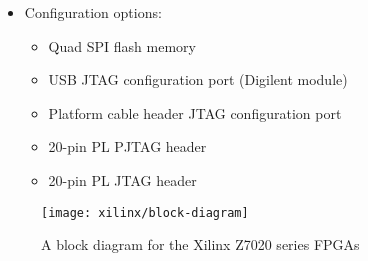 \begin{itemize}
    \item Configuration options:
    \begin{itemize}
        \item Quad \gls{SPI} flash memory
        \item \gls{USB} \gls{JTAG} configuration port (Digilent module)
        \item Platform cable header \gls{JTAG} configuration port
        \item 20-pin \gls{PL} \gls{PJTAG} header
        \item 20-pin \gls{PL} \gls{JTAG} header
    \end{itemize}
\end{itemize}

\begin{figure}
    \centering
    \texttt{[image: xilinx/block-diagram]}
    \caption{A block diagram for the Xilinx Z7020 series \glspl{FPGA}}
    \label{fig:zynq:blockDiagram}
\end{figure}